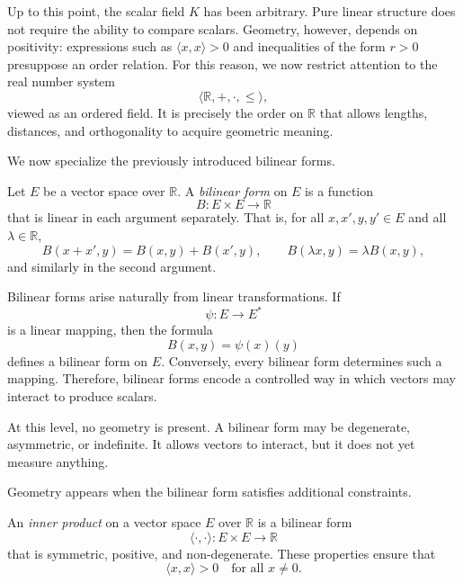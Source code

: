 Up to this point, the scalar field $K$ has been arbitrary.
Pure linear structure does not require the ability to compare scalars.
Geometry, however, depends on positivity: expressions such as
$\langle x,x\rangle > 0$ and inequalities of the form $r>0$
presuppose an order relation.
For this reason, we now restrict attention to the real number system
\[
\Big\langle \mathbb{R}, +, \cdot, \le \Big\rangle,
\]
viewed as an ordered field.
It is precisely the order on $\mathbb{R}$ that allows lengths, distances, and
orthogonality to acquire geometric meaning.

\medskip

We now specialize the previously introduced bilinear forms.

\medskip

Let $E$ be a vector space over $\mathbb{R}$.
A \emph{bilinear form} on $E$ is a function
\[
B : E \times E \longrightarrow \mathbb{R}
\]
that is linear in each argument separately.
That is, for all $x,x',y,y' \in E$ and all $\lambda \in \mathbb{R}$,
\[
B(x+x',y)=B(x,y)+B(x',y), \qquad
B(\lambda x,y)=\lambda B(x,y),
\]
and similarly in the second argument.

\medskip

Bilinear forms arise naturally from linear transformations.
If
\[
\psi : E \longrightarrow E^*
\]
is a linear mapping, then the formula
\[
B(x,y) = \psi(x)(y)
\]
defines a bilinear form on $E$.
Conversely, every bilinear form determines such a mapping.
Therefore, bilinear forms encode a controlled way in which vectors may interact
to produce scalars.

\medskip

At this level, no geometry is present.
A bilinear form may be degenerate, asymmetric, or indefinite.
It allows vectors to interact, but it does not yet measure anything.

\medskip

Geometry appears when the bilinear form satisfies additional constraints.


\medskip

An \emph{inner product} on a vector space $E$ over $\mathbb{R}$
is a bilinear form
\[
\langle \cdot,\cdot \rangle : E \times E \longrightarrow \mathbb{R}
\]
that is symmetric, positive, and non-degenerate.
These properties ensure that
\[
\langle x,x \rangle > 0 \quad \text{for all } x \neq 0.
\]

